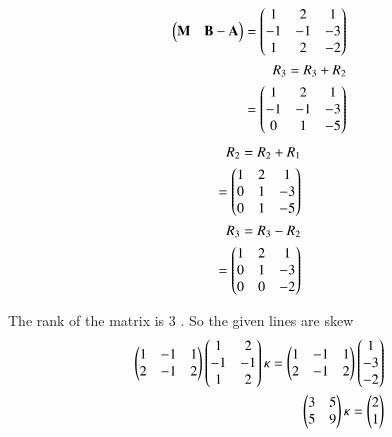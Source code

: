 \documentclass[journal]{IEEEtran}
\begin{document}
\begin{align}
    \begin{pmatrix}\mathbf{M} & \mathbf{B-A}\end{pmatrix} = \begin{pmatrix}1 & 2 & 1 \\ -1 & -1 & -3\\1 & 2 & -2\end{pmatrix}\\
    R_3 = R_3 + R_2\\
    = \begin{pmatrix}1 & 2 & 1 \\ -1 & -1 & -3\\0 & 1 & -5\end{pmatrix}
    \end{align}
\begin{align}
    R_2 = R_2 + R_1\\
       = \begin{pmatrix}1 & 2 & 1 \\ 0 & 1 & -3\\0 & 1 & -5\end{pmatrix}\\
    R_3 = R_3  - R_2 \\
         = \begin{pmatrix}1 & 2 & 1 \\ 0 & 1 & -3\\0 & 0 & -2\end{pmatrix}
\end{align}

The rank of the matrix is 3 . So the given lines are skew 
\begin{align}
    \begin{pmatrix}1 & -1 & 1 \\ 2 & -1 & 2\end{pmatrix}\begin{pmatrix}1 & 2 \\ -1 & -1\\1 & 2\end{pmatrix}\kappa = \begin{pmatrix}1 & -1 & 1 \\ 2 & -1 & 2\end{pmatrix}\begin{pmatrix}1 \\ -3 \\-2\end{pmatrix} \\
  \begin{pmatrix}3 & 5\\5 & 9\end{pmatrix}\kappa = \begin{pmatrix}2 \\ 1\end{pmatrix}
\end{align}
\end{document}
